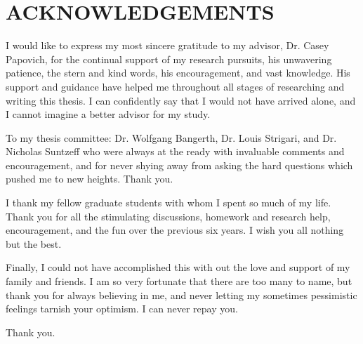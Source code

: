 %
%
%


\chapter*{ACKNOWLEDGEMENTS}


\indent 
I would like to express my most sincere gratitude to my advisor, Dr. Casey Papovich, for the continual support of my research pursuits, his unwavering patience, the stern and kind words, his encouragement, and vast knowledge. His support and guidance have helped me throughout all stages of researching and writing this thesis. I can confidently say that I would not have arrived alone, and I cannot imagine a better advisor for my study.

To my thesis committee: Dr. Wolfgang Bangerth, Dr. Louis Strigari, and Dr. Nicholas Suntzeff who were always at the ready with invaluable comments and encouragement, and for never shying away from asking the hard questions which pushed me to new heights. Thank you.

I thank my fellow graduate students with whom I spent so much of my life. Thank you for all the stimulating discussions, homework and research help, encouragement, and the fun over the previous six years. I wish you all nothing but the best.

Finally, I could not have accomplished this with out the love and support of my family and friends. I am so very fortunate that there are too many to name, but thank you for always believing in me, and never letting my sometimes pessimistic feelings tarnish your optimism. I can never repay you. 

Thank you.

\pagebreak{}
